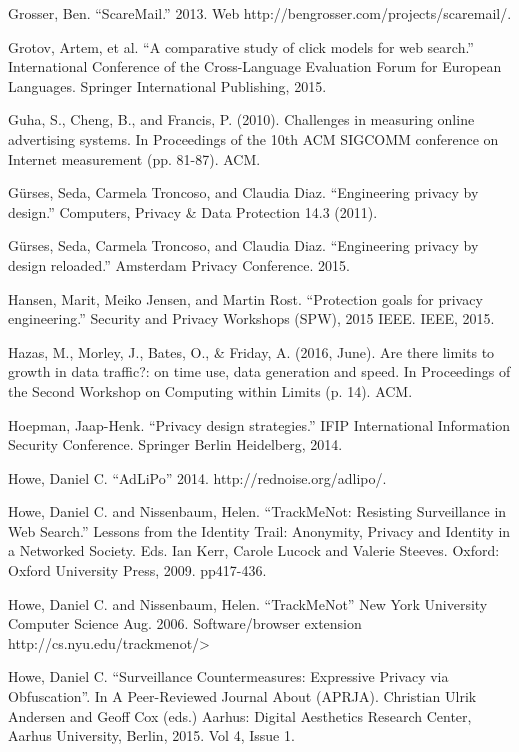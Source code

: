\documentclass[conference]{IEEEtran}
\begin{document}
\begin{thebibliography}{99}
 Grosser, Ben. ``ScareMail.'' 2013. Web http://bengrosser.com/projects/scaremail/.

 Grotov, Artem, et al. ``A comparative study of click models for web search.'' International Conference of the Cross-Language Evaluation Forum for European Languages. Springer International Publishing, 2015.

 Guha, S., Cheng, B., and Francis, P. (2010). Challenges in measuring online advertising systems. In Proceedings of the 10th ACM SIGCOMM conference on Internet measurement (pp. 81-87). ACM.

 Gürses, Seda, Carmela Troncoso, and Claudia Diaz. ``Engineering privacy by design.'' Computers, Privacy \& Data Protection 14.3 (2011).

 Gürses, Seda, Carmela Troncoso, and Claudia Diaz. ``Engineering privacy by design reloaded.'' Amsterdam Privacy Conference. 2015.

 Hansen, Marit, Meiko Jensen, and Martin Rost. ``Protection goals for privacy engineering.'' Security and Privacy Workshops (SPW), 2015 IEEE. IEEE, 2015.

 Hazas, M., Morley, J., Bates, O., \& Friday, A. (2016, June). Are there limits to growth in data traffic?: on time use, data generation and speed. In Proceedings of the Second Workshop on Computing within Limits (p. 14). ACM.

 Hoepman, Jaap-Henk. ``Privacy design strategies.'' IFIP International Information Security Conference. Springer Berlin Heidelberg, 2014.

 Howe, Daniel C. ``AdLiPo'' 2014. http://rednoise.org/adlipo/.

 Howe, Daniel C. and Nissenbaum, Helen. ``TrackMeNot: Resisting Surveillance in Web Search.'' Lessons from the Identity Trail: Anonymity, Privacy and Identity in a Networked Society. Eds. Ian Kerr, Carole Lucock and Valerie Steeves. Oxford: Oxford University Press, 2009. pp417-436.

 Howe, Daniel C. and Nissenbaum, Helen. ``TrackMeNot'' New York University Computer Science Aug. 2006. Software/browser extension http://cs.nyu.edu/trackmenot/>

 Howe, Daniel C. ``Surveillance Countermeasures: Expressive Privacy via Obfuscation''. In A Peer-Reviewed Journal About (APRJA). Christian Ulrik Andersen and Geoff Cox (eds.) Aarhus: Digital Aesthetics Research Center, Aarhus University, Berlin, 2015. Vol 4, Issue 1.


\end{thebibliography}
\end{document}
